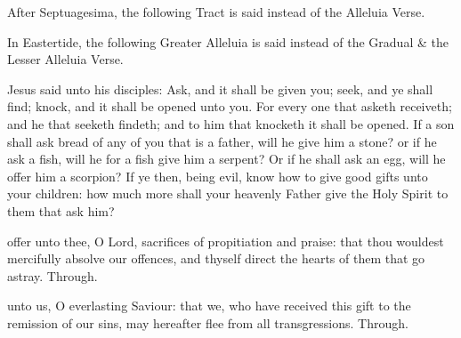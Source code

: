 \begin{rubric}
    After Septuagesima, the following Tract is said instead of the Alleluia Verse.
\end{rubric}


\begin{rubric}
    In Eastertide, the following Greater Alleluia is said instead of the Gradual \& the Lesser Alleluia Verse.
\end{rubric}


 Jesus said unto his disciples: Ask, and it shall be given you; seek, and ye shall find; knock, and it shall be opened unto you. For every one that asketh receiveth; and he that seeketh findeth; and to him that knocketh it shall be opened. If a son shall ask bread of any of you that is a father, will he give him a stone? or if he ask a fish, will he for a fish give him a serpent? Or if he shall ask an egg, will he offer him a scorpion? If ye then, being evil, know how to give good gifts unto your children: how much more shall your heavenly Father give the Holy Spirit to them that ask him?


\secret
{} offer unto thee, O Lord, sacrifices of propitiation and praise: that thou wouldest mercifully absolve our offences, and thyself direct the hearts of them that go astray. Through.


\postcommunion
{} unto us, O everlasting Saviour: that we, who have received this gift to the remission of our sins, may hereafter flee from all transgressions. Through.


